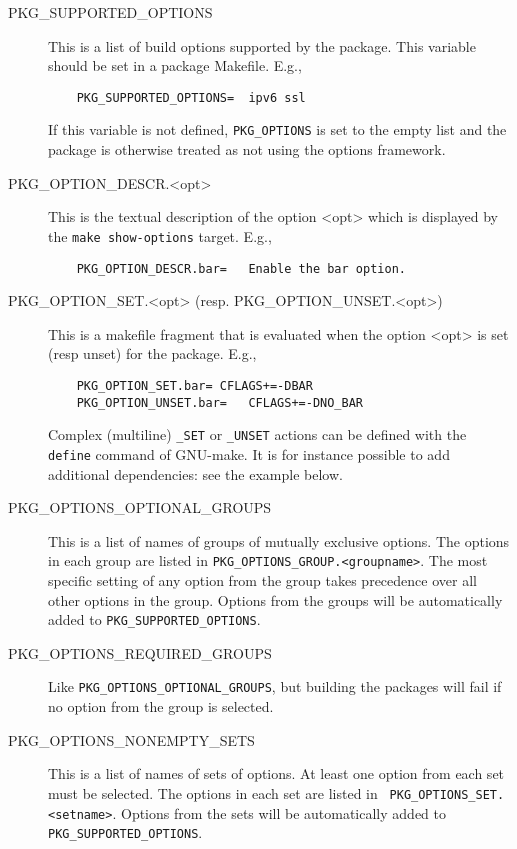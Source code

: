 \begin{description}

   \item[PKG\_SUPPORTED\_OPTIONS]
   This is a list of build options supported by the package. This variable
   should be set in a package Makefile.  E.g.,
\begin{verbatim}
	PKG_SUPPORTED_OPTIONS=	ipv6 ssl
\end{verbatim}
   If this variable is not defined, {\tt PKG\_OPTIONS} is set to the empty list
   and the package is otherwise treated as not using the options framework.

   \smallbreak
   \item[PKG\_OPTION\_DESCR.<opt>]
   This is the textual description of the option <opt> which is displayed by
   the {\tt make show-options} target. E.g.,
\begin{verbatim}
	PKG_OPTION_DESCR.bar=	Enable the bar option.
\end{verbatim}

   \smallbreak
   \item[PKG\_OPTION\_SET.<opt> (resp. PKG\_OPTION\_UNSET.<opt>)]
   This is a makefile fragment that is evaluated when the option <opt> is set
   (resp unset) for the package. E.g.,
\begin{verbatim}
	PKG_OPTION_SET.bar=	CFLAGS+=-DBAR
	PKG_OPTION_UNSET.bar=	CFLAGS+=-DNO_BAR
\end{verbatim}
   Complex (multiline) {\tt \_SET} or {\tt \_UNSET} actions can be defined with
   the {\tt define} command of GNU-make. It is for instance possible to add
   additional dependencies: see the example below.

   \smallbreak
   \item[PKG\_OPTIONS\_OPTIONAL\_GROUPS]
   This is a list of names of groups of mutually exclusive options.  The
   options in each group are listed in {\tt PKG\_OPTIONS\_GROUP.<groupname>}.
   The most specific setting of any option from the group takes precedence over
   all other options in the group.  Options from the groups will be
   automatically added to {\tt PKG\_SUPPORTED\_OPTIONS}.

   \smallbreak
   \item[PKG\_OPTIONS\_REQUIRED\_GROUPS]
   Like {\tt PKG\_OPTIONS\_OPTIONAL\_GROUPS}, but building the packages will
   fail if no option from the group is selected.

   \smallbreak
   \item[PKG\_OPTIONS\_NONEMPTY\_SETS]
   This is a list of names of sets of options.  At least one option from each
   set must be selected. The options in each set are listed in {\tt
   PKG\_OPTIONS\_SET.<setname>}.  Options from the sets will be automatically
   added to {\tt PKG\_SUPPORTED\_OPTIONS}.


\end{description}
